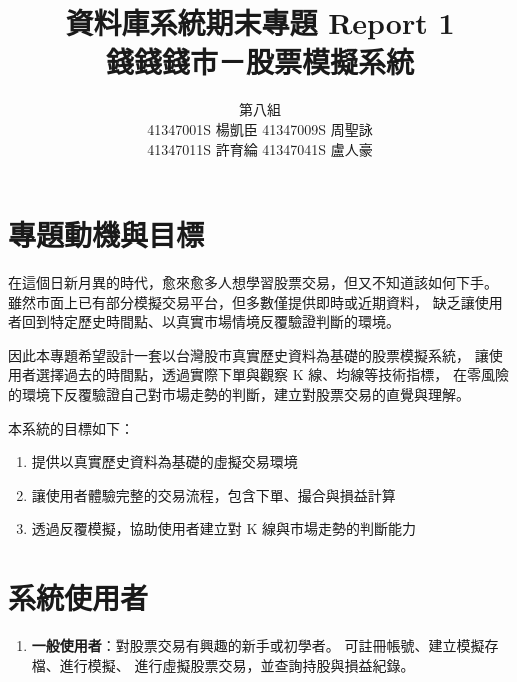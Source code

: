 \documentclass[UTF8, a4paper, 12pt, fontset=none]{ctexart}
\title{資料庫系統期末專題 Report 1\\ \textbf{錢錢錢市－股票模擬系統}}
\author{
    \begin{tabular}{c}
        第八組 \\ 
        41347001S 楊凱臣 \quad 41347009S 周聖詠 \\ 
        41347011S 許育綸 \quad 41347041S 盧人豪
    \end{tabular}
}
\date{}
\begin{document}
    \maketitle

    \section{專題動機與目標}
    在這個日新月異的時代，愈來愈多人想學習股票交易，但又不知道該如何下手。
    雖然市面上已有部分模擬交易平台，但多數僅提供即時或近期資料，
    缺乏讓使用者回到特定歷史時間點、以真實市場情境反覆驗證判斷的環境。

    因此本專題希望設計一套以台灣股市真實歷史資料為基礎的股票模擬系統，
    讓使用者選擇過去的時間點，透過實際下單與觀察 K 線、均線等技術指標，
    在零風險的環境下反覆驗證自己對市場走勢的判斷，建立對股票交易的直覺與理解。

    本系統的目標如下：
    \begin{enumerate}
        \item 提供以真實歷史資料為基礎的虛擬交易環境
        \item 讓使用者體驗完整的交易流程，包含下單、撮合與損益計算
        \item 透過反覆模擬，協助使用者建立對 K 線與市場走勢的判斷能力
    \end{enumerate}

    \section{系統使用者}
    \begin{enumerate}
        \item \textbf{一般使用者}：對股票交易有興趣的新手或初學者。
            可註冊帳號、建立模擬存檔、進行模擬、
            進行虛擬股票交易，並查詢持股與損益紀錄。
    \end{enumerate}

\end{document}
